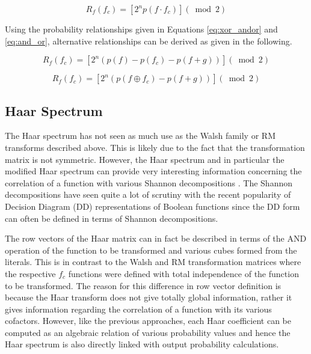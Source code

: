 \begin{equation}
R_f(f_c) = [2^np(f \cdot f_c)] (\bmod{2})   \label{eq:rm1}
\end{equation}

Using the probability relationships given in Equations \ref{eq:xor_andor} and 
\ref{eq:and_or}, alternative relationships can be derived as given in the
following.

\begin{equation}
R_f(f_c) = [2^n (p(f)-p(f_c)-p(f+g))] (\bmod{2}) \label{eq:rm2}
\end{equation}

\begin{equation}
R_f(f_c) = [2^n (p(f \oplus f_c)-p(f+g))] (\bmod{2}) \label{eq:rm3}
\end{equation}

\subsection{Haar Spectrum}
The Haar spectrum \cite{AR75} \cite{SH81} \cite{MK76} 
has not seen as much use as the Walsh family or RM transforms
described above.  This is likely due to the fact that the transformation matrix
is not symmetric. However, the Haar spectrum and
in particular the modified Haar spectrum can provide very interesting information
concerning the correlation of a function with various Shannon decompositions \cite{HMM85}.  The
Shannon decompositions have seen quite a lot of scrutiny with the recent popularity
of Decision Diagram (DD) representations of Boolean functions since the DD form can
often be defined in terms of Shannon decompositions.

The row vectors of the Haar matrix can in fact be described in terms of the AND
operation of the function to be transformed and various cubes formed from the 
literals.  This is in contrast to the Walsh and RM transformation matrices where the
respective $f_c$ functions were defined with total independence of the function to
be transformed.  The reason for this difference in row vector definition
is because the Haar transform
does not give totally global information, rather it gives information regarding
the correlation of a function with its various cofactors.  However, like the previous
approaches, each Haar coefficient can be computed as an algebraic relation of various
probability values and hence the Haar spectrum is also directly linked with output
probability calculations.

